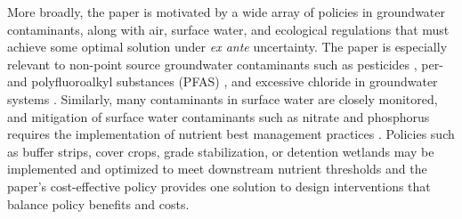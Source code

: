 \documentclass[12pt]{article}
\begin{document}
More broadly, the paper is motivated by a wide array of policies in groundwater contaminants, along with air, surface water, and ecological regulations that must achieve some optimal solution under \textit{ex ante} uncertainty. 
The paper is especially relevant to non-point source groundwater contaminants such as pesticides \citep{Stackelberg2012}, per- and polyfluoroalkyl substances (PFAS) \citep{park2024statistical, Guo2022, Gnesda2022}, and excessive chloride in groundwater systems \citep{Pieper2018}. Similarly, many contaminants in surface water are closely monitored, and mitigation of surface water contaminants such as nitrate and phosphorus requires the implementation of nutrient best management practices \citep{Dai2018}. Policies such as buffer strips, cover crops, grade stabilization, or detention wetlands may be implemented and optimized to meet downstream nutrient thresholds 
and the paper's cost-effective policy provides one solution to design interventions that balance policy benefits and costs.
\end{document}
